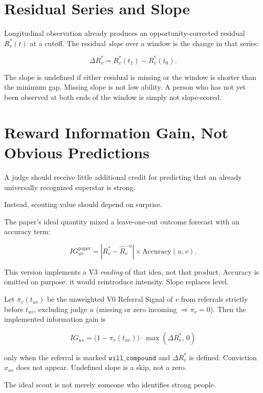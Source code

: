 \documentclass[11pt]{article}
\begin{document}
\section{Residual Series and Slope}

Longitudinal observation already produces an opportunity-corrected residual
\(R_v^\ast(t)\) at a cutoff. The residual \emph{slope} over a window is the
change in that series:

\[
\Delta R_v^\ast
=
R_v^\ast(t_1)-R_v^\ast(t_0).
\]

The slope is undefined if either residual is missing or the window is shorter
than the minimum gap. Missing slope is not low ability. A person who has not
yet been observed at both ends of the window is simply not slope-scored.

\section{Reward Information Gain, Not Obvious Predictions}

A judge should receive little additional credit for predicting that an already
universally recognized superstar is strong.

Instead, scouting value should depend on surprise.

The paper's ideal quantity mixed a leave-one-out outcome forecast with an
accuracy term:

\[
IG_{uv}^{\mathrm{paper}}
=
\left|
R_v^\ast-\hat R_v^{-u}
\right|
\times
\mathrm{Accuracy}(u,v).
\]

This version implements a V3 \emph{reading} of that idea, not that product.
Accuracy is omitted on purpose: it would reintroduce intensity. Slope replaces
level.

Let \(\pi_v(t_{uv})\) be the unweighted V0 Referral Signal of \(v\) from
referrals strictly before \(t_{uv}\), excluding judge \(u\)
(missing or zero incoming \(\Rightarrow \pi_v=0\)).
Then the implemented information gain is

\[
\boxed{
IG_{uv}
=
\bigl(1-\pi_v(t_{uv})\bigr)\cdot\max(\Delta R_v^\ast,\,0)
}
\]

only when the referral is marked \(\mathtt{will\_compound}\) and
\(\Delta R_v^\ast\) is defined. Conviction \(x_{uv}\) does not appear.
Undefined slope is a skip, not a zero.

The ideal scout is not merely someone who identifies strong people.
\end{document}
